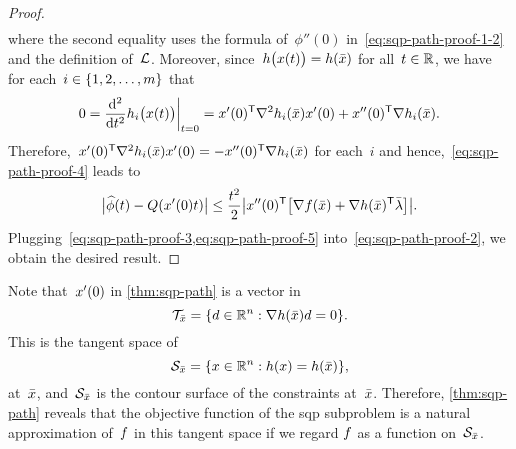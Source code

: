 \begin{proof}
\begin{subequations}
\begin{align}
        \end{align}
    \end{subequations}
    where the second equality uses the formula of~$\phi''(0)$ in~\cref{eq:sqp-path-proof-1-2} and the definition of~$\lag$.
    Moreover, since~$h \big( \iter(t) \big) = h(\bar{\iter})$ for all~$t \in \mathbb{R}$, we have for each~$i \in \{1, 2, \dots, m\}$ that
    \begin{equation}
        \label{eq:sqp-path-proof-6}
        0 = \frac{\du^2}{\du t^2} h_i \big( \iter(t) \big) \bigg\vert_{t = 0} = \iter'(0)^{\T} \nabla^2 h_i(\bar{\iter}) \iter'(0) + \iter''(0)^{\T} \nabla h_i(\bar{\iter}).
    \end{equation}
    Therefore,~$\iter'(0)^{\T} \nabla^2 h_i(\bar{\iter}) \iter'(0) = -\iter''(0)^{\T} \nabla h_i(\bar{\iter})$ for each~$i$ and hence,~\cref{eq:sqp-path-proof-4} leads to
    \begin{equation}
        \label{eq:sqp-path-proof-5}
        \abs[\big]{\widehat{\phi}(t) - Q(x'(0) t)} \le \frac{t^2}{2} \abs[\big]{\iter''(0)^{\T} \big[ \nabla \obj(\bar{\iter}) + \nabla h(\bar{\iter})^{\T} \bar{\lm} \big]}.
    \end{equation}
    Plugging~\cref{eq:sqp-path-proof-3,eq:sqp-path-proof-5} into~\cref{eq:sqp-path-proof-2}, we obtain the desired result.
\end{proof}

Note that~$\iter'(0)$ in \cref{thm:sqp-path} is a vector in
\begin{equation*}
    \mathcal{T}_{\bar{\iter}} = \set{\step \in \R^n : \nabla h(\bar{\iter}) \step = 0}.
\end{equation*}
This is the tangent space of
\begin{equation*}
    \mathcal{S}_{\bar{\iter}} = \set{\iter \in \R^n : h(\iter) = h(\bar{\iter})},
\end{equation*}
at~$\bar{\iter}$, and~$\mathcal{S}_{\bar{\iter}}$ is the contour surface of the constraints at~$\bar{\iter}$.
Therefore, \cref{thm:sqp-path} reveals that the objective function of the \gls{sqp} subproblem is a natural approximation of~$f$ in this tangent space if we regard $f$ as a function on~$\mathcal{S}_{\bar{\iter}}$.

